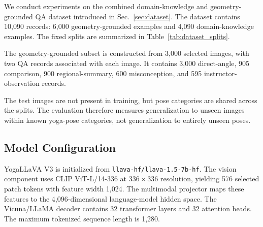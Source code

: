 We conduct experiments on the combined domain-knowledge and
geometry-grounded QA dataset introduced in Sec.~\ref{sec:dataset}. The
dataset contains 10,090 records: 6,000 geometry-grounded examples and
4,090 domain-knowledge examples. The fixed splits are summarized in
Table~\ref{tab:dataset_splits}.

\begin{table}[t]
    \centering
    \caption{Composition of the YogaLLaVA V3 instruction-tuning dataset.}
    \label{tab:dataset_splits}
\end{table}

The geometry-grounded subset is constructed from 3,000 selected images,
with two QA records associated with each image. It contains 3,000
direct-angle, 905 comparison, 900 regional-summary, 600 misconception,
and 595 instructor-observation records.

The test images are not present in training, but pose categories are
shared across the splits. The evaluation therefore measures
generalization to unseen images within known yoga-pose categories, not
generalization to entirely unseen poses.

\subsection{Model Configuration}
\label{sec:model_configuration}

YogaLLaVA V3 is initialized from
\texttt{llava-hf/llava-1.5-7b-hf}. The vision component uses CLIP
ViT-L/14-336 at $336\times336$ resolution, yielding 576 selected patch
tokens with feature width 1,024. The multimodal projector maps these
features to the 4,096-dimensional language-model hidden space. The
Vicuna/LLaMA decoder contains 32 transformer layers and 32 attention
heads. The maximum tokenized sequence length is 1,280.

